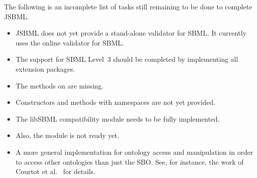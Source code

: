 
The following is an incomplete list of tasks still remaining to be done to
complete JSBML.

\begin{itemize}

\item JSBML does not yet provide a stand-alone validator for SBML. It
  currently uses the online validator for SBML.

\item The support for SBML Level~3 should be completed
  by implementing all extension packages.

\item The 
  methods on  are missing.

\item Constructors and methods with namespaces are not yet provided.

\item The libSBML compatibility module
  needs to be fully implemented.

\item Also, the  module is not ready yet.

\item A more general implementation for ontology access and manipulation in
  order to access other ontologies than just the SBO. See, for instance,
  the work of Courtot et al.~\cite{Courtot2011a} for details.

\end{itemize}
